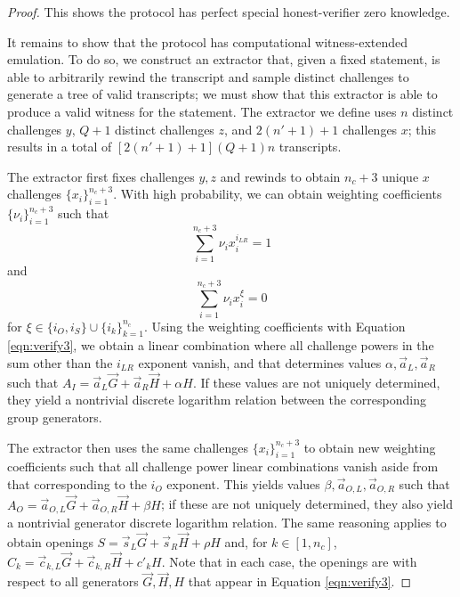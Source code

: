 \documentclass{article}
\begin{document}
\begin{proof}
	This shows the protocol has perfect special honest-verifier zero knowledge.

	It remains to show that the protocol has computational witness-extended emulation.
	To do so, we construct an extractor that, given a fixed statement, is able to arbitrarily rewind the transcript and sample distinct challenges to generate a tree of valid transcripts; we must show that this extractor is able to produce a valid witness for the statement.
	The extractor we define uses $n$ distinct challenges $y$, $Q + 1$ distinct challenges $z$, and $2(n' + 1) + 1$ challenges $x$; this results in a total of $\left[ 2(n' + 1) + 1 \right] (Q + 1) n$ transcripts.

	The extractor first fixes challenges $y, z$ and rewinds to obtain $n_c + 3$ unique $x$ challenges $\{ x_i \}_{i=1}^{n_c + 3}$.
	With high probability, we can obtain weighting coefficients $\{ \nu_i \}_{i=1}^{n_c + 3}$ such that 
	$$\sum_{i=1}^{n_c + 3} \nu_i x_i^{i_{LR}} = 1$$
	and
	$$\sum_{i=1}^{n_c + 3} \nu_i x_i^\xi = 0$$
	for $\xi \in \{ i_O, i_S \} \cup \{ i_k \}_{k=1}^{n_c}$.
	Using the weighting coefficients with Equation \ref{eqn:verify3}, we obtain a linear combination where all challenge powers in the sum other than the $i_{LR}$ exponent vanish, and that determines values $\alpha, \vec{a}_L, \vec{a}_R$ such that $A_I = \vec{a}_L \vec{G} + \vec{a}_R \vec{H} + \alpha H$.
	If these values are not uniquely determined, they yield a nontrivial discrete logarithm relation between the corresponding group generators.

	The extractor then uses the same challenges $\{ x_i \}_{i=1}^{n_c + 3}$ to obtain new weighting coefficients such that all challenge power linear combinations vanish aside from that corresponding to the $i_O$ exponent.
	This yields values $\beta, \vec{a}_{O,L}, \vec{a}_{O,R}$ such that $A_O = \vec{a}_{O,L} \vec{G} + \vec{a}_{O,R} \vec{H} + \beta H$; if these are not uniquely determined, they also yield a nontrivial generator discrete logarithm relation.
	The same reasoning applies to obtain openings $S = \vec{s}_L \vec{G} + \vec{s}_R \vec{H} + \rho H$ and, for $k \in [1, n_c]$, $C_k = \vec{c}_{k,L} \vec{G} + \vec{c}_{k,R} \vec{H} + c'_k H$.
	Note that in each case, the openings are with respect to all generators $\vec{G}, \vec{H}, H$ that appear in Equation \ref{eqn:verify3}.


\end{proof}
\end{document}
